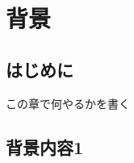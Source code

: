 \documentclass[thesis]{subfiles}
\begin{document}
\chapter{背景}
\section{はじめに}
この章で何やるかを書く
\section{背景内容1}
\end{document}
